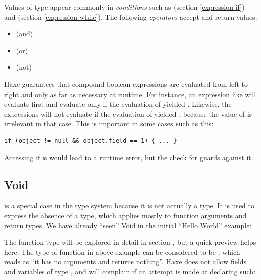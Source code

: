 \documentclass{haxe}
\begin{document}
Values of type  appear commonly in \emph{conditions} such as  (section \ref{expression-if}) and  (section \ref{expression-while}). The following \emph{operators} accept and return  values:
\begin{itemize}
	\item \expr{\&\&} (and)
	\item \expr{||} (or)
	\item \expr{!} (not)
\end{itemize}
Haxe guarantees that compound boolean expressions are evaluated from left to right and only as far as necessary at runtime. For instance, an expression like  will evaluate  first and evaluate  only if the evaluation of  yielded . Likewise, the expressions  will not evaluate  if the evaluation of  yielded , because the value of  is irrelevant in that case.
This is important in some cases such as this:

\begin{lstlisting}
if (object != null && object.field == 1) { ... }
\end{lstlisting}
Accessing  if  is  would lead to a runtime error, but the check for  guards against it.




\subsection{Void}
\label{types-void}


 is a special case in the type system because it is not actually a type. It is used to express the absence of a type, which applies mostly to function arguments and return types.
We have already ``seen'' Void in the initial ``Hello World'' example:

The function type will be explored in detail in section , but a quick preview helps here: The type of function  in above example can be considered to be , which reads as ``it has no arguments and returns nothing''.
Haxe does not allow fields and variables of type , and will complain if an attempt is made at declaring such:
\end{document}
